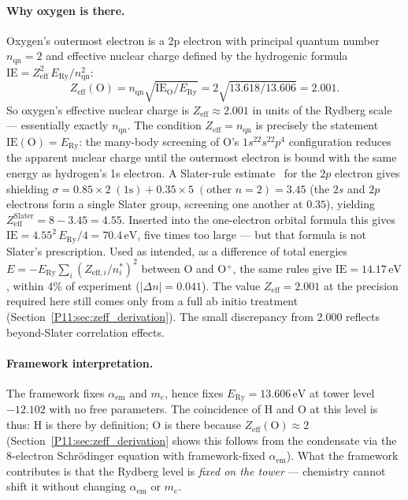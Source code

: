 \documentclass[11pt,a4paper]{article}
\theoremstyle{definition}
\theoremstyle{remark}
\newcommand{\ERy}{E_{\mathrm{Ry}}}
\newcommand{\aem}{\alpha_{\mathrm{em}}}
\newcommand{\IE}{\mathrm{IE}}
\begin{document}
\paragraph{Why oxygen is there.}
Oxygen's outermost electron is a 2p electron with principal
quantum number $n_\mathrm{qn}=2$ and effective nuclear charge
defined by the hydrogenic formula $\IE = Z_\mathrm{eff}^2\,\ERy/n_\mathrm{qn}^2$:
\begin{equation}
  Z_\mathrm{eff}(\mathrm{O})
  = n_\mathrm{qn}\sqrt{\IE_\mathrm{O}/\ERy}
  = 2\sqrt{13.618/13.606}
  = 2.001.
  \label{P11:eq:Zeff_O}
\end{equation}
So oxygen's effective nuclear charge is $Z_\mathrm{eff} \approx 2.001$
in units of the Rydberg scale --- essentially exactly $n_\mathrm{qn}$.
The condition $Z_\mathrm{eff}=n_\mathrm{qn}$ is precisely the
statement $\IE(\mathrm{O}) = \ERy$: the many-body screening of O's
$1s^22s^22p^4$ configuration reduces the apparent nuclear charge
until the outermost electron is bound with the same energy as
hydrogen's 1s electron.
A Slater-rule estimate~\cite{Slater1930} for the $2p$ electron gives
shielding $\sigma = 0.85\times2\;(\text{1s}) + 0.35\times5\;(\text{other }n{=}2) = 3.45$
(the $2s$ and $2p$ electrons form a single Slater group, screening one
another at $0.35$), yielding
$Z_\mathrm{eff}^\mathrm{Slater} = 8-3.45 = 4.55$.
Inserted into the one-electron orbital formula this gives
$\IE = 4.55^2\,\ERy/4 = 70.4\,\mathrm{eV}$, five times too large ---
but that formula is not Slater's prescription.  Used as intended, as a
difference of total energies
$E=-\ERy\sum_i (Z_{\mathrm{eff},i}/n^*_i)^2$ between O and O$^+$, the
same rules give $\IE = 14.17\,\mathrm{eV}$, within $4\%$ of
experiment ($|\Delta n| = 0.041$).
The value $Z_\mathrm{eff} = 2.001$ at the precision required here
still comes only from a full ab initio treatment
(Section~\ref{P11:sec:zeff_derivation}).
The small discrepancy from 2.000 reflects beyond-Slater correlation
effects.

\paragraph{Framework interpretation.}
The framework fixes $\aem$ and $m_e$, hence fixes $\ERy = 13.606\,\mathrm{eV}$
at tower level $-12.102$ with no free parameters.
The coincidence of H and O at this level is thus:
H is there by definition;
O is there because $Z_\mathrm{eff}(\mathrm{O}) \approx 2$
(Section~\ref{P11:sec:zeff_derivation} shows this follows from the condensate
via the 8-electron Schrödinger equation with framework-fixed $\aem$).
What the framework contributes is that the Rydberg level is
\emph{fixed on the tower} --- chemistry cannot shift it
without changing $\aem$ or $m_e$.
\end{document}
